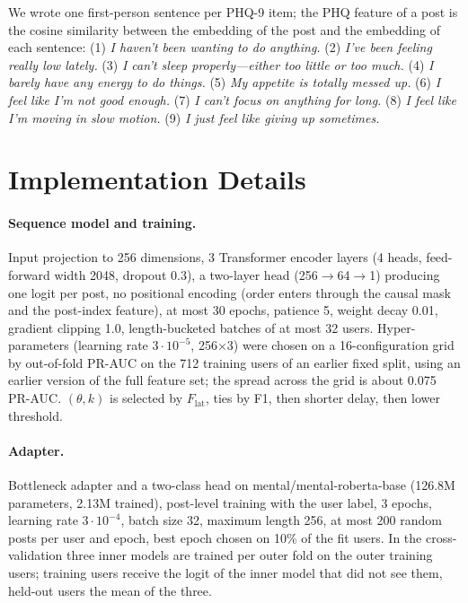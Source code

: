 \documentclass[11pt]{article}
\begin{document}
We wrote one first-person sentence per PHQ-9 item; the PHQ feature of a post is the cosine similarity between the embedding of the post and the embedding of each sentence:
(1) \emph{I haven't been wanting to do anything.}
(2) \emph{I've been feeling really low lately.}
(3) \emph{I can't sleep properly---either too little or too much.}
(4) \emph{I barely have any energy to do things.}
(5) \emph{My appetite is totally messed up.}
(6) \emph{I feel like I'm not good enough.}
(7) \emph{I can't focus on anything for long.}
(8) \emph{I feel like I'm moving in slow motion.}
(9) \emph{I just feel like giving up sometimes.}

\section{Implementation Details}
\label{app:impl}

\paragraph{Sequence model and training.}
Input projection to 256 dimensions, 3 Transformer encoder layers (4 heads, feed-forward width 2048, dropout 0.3), a two-layer head (256$\rightarrow$64$\rightarrow$1) producing one logit per post, no positional encoding (order enters through the causal mask and the post-index feature), at most 30 epochs, patience 5, weight decay 0.01, gradient clipping 1.0, length-bucketed batches of at most 32 users.
Hyper-parameters (learning rate $3\cdot10^{-5}$, 256$\times$3) were chosen on a 16-configuration grid by out-of-fold PR-AUC on the 712 training users of an earlier fixed split, using an earlier version of the full feature set; the spread across the grid is about 0.075 PR-AUC.
$(\theta,k)$ is selected by $F_{\mathrm{lat}}$, ties by F1, then shorter delay, then lower threshold.

\paragraph{Adapter.}
Bottleneck adapter and a two-class head on mental/mental-roberta-base (126.8M parameters, 2.13M trained), post-level training with the user label, 3 epochs, learning rate $3\cdot10^{-4}$, batch size 32, maximum length 256, at most 200 random posts per user and epoch, best epoch chosen on 10\% of the fit users.
In the cross-validation three inner models are trained per outer fold on the outer training users; training users receive the logit of the inner model that did not see them, held-out users the mean of the three.
\end{document}
